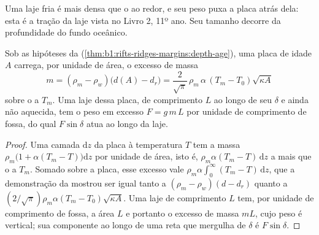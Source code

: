 Uma laje fria é mais densa que o  ao redor, e seu peso puxa a placa atrás dela: esta é a tração da laje vista no Livro 2, 11º ano. Seu tamanho decorre da profundidade do fundo oceânico.

\begin{proposition}\label{prop:b1:active-margins:slab-weight}
Sob as hipóteses da 
(\cref{thm:b1:rifts-ridges-margins:depth-age}), uma placa de idade $A$ carrega, por unidade de área, o excesso de massa
\[
  m = (\rho_m - \rho_w)\bigl(d(A) - d_r\bigr)
    = \frac{2}{\sqrt\pi}\,\rho_m\,\alpha\,(T_m - T_0)\sqrt{\kappa A}
\]
sobre o  a $T_m$. Uma laje dessa placa, de comprimento $L$ ao longo de seu 
$\delta$ e ainda não aquecida, tem o peso em excesso $F = g\,m\,L$ por unidade de comprimento de fossa, do qual $F\sin\delta$ atua ao longo da laje.
\end{proposition}

\begin{proof}
Uma camada $\mathrm dz$ da placa à temperatura $T$ tem a massa $\rho_m\bigl(1 + \alpha(T_m - T)\bigr)\mathrm dz$ por unidade de área, isto é, $\rho_m\alpha(T_m - T)\,\mathrm dz$ a mais que o  a $T_m$. Somado sobre a placa, esse excesso vale $\rho_m\alpha\int_0^\infty (T_m - T)\,\mathrm dz$, que a demonstração da  mostrou ser igual tanto a $(\rho_m - \rho_w)(d - d_r)$ quanto a $(2/\sqrt\pi)\rho_m\alpha(T_m - T_0)
\sqrt{\kappa A}$. Uma laje de comprimento $L$ tem, por unidade de comprimento de fossa, a área $L$ e portanto o excesso de massa $mL$, cujo peso é vertical; sua componente ao longo de uma reta que mergulha de $\delta$ é $F\sin\delta$.
\end{proof}

